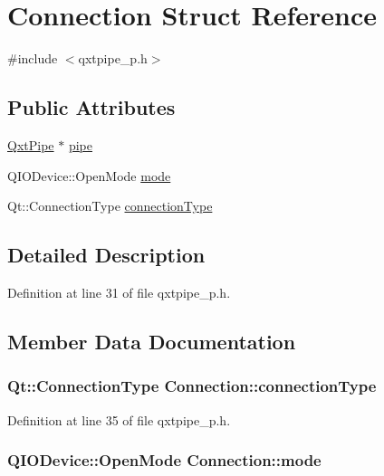 \hypertarget{struct_connection}{\section{Connection Struct Reference}
\label{struct_connection}
}


{\ttfamily \#include $<$qxtpipe\-\_\-p.\-h$>$}

\subsection*{Public Attributes}
\begin{DoxyCompactItemize}
\item 
\hyperlink{class_qxt_pipe}{Qxt\-Pipe} $\ast$ \hyperlink{struct_connection_ab227c6e0789a3c0a569f0a8912ef0364}{pipe}
\item 
Q\-I\-O\-Device\-::\-Open\-Mode \hyperlink{struct_connection_a35f72440ff0f76a89c1700b394a3990c}{mode}
\item 
Qt\-::\-Connection\-Type \hyperlink{struct_connection_ac46f218a8440e1e3ec23ba8bad70488f}{connection\-Type}
\end{DoxyCompactItemize}


\subsection{Detailed Description}


Definition at line 31 of file qxtpipe\-\_\-p.\-h.



\subsection{Member Data Documentation}
\hypertarget{struct_connection_ac46f218a8440e1e3ec23ba8bad70488f}{
\subsubsection[{connection\-Type}]{\setlength{\rightskip}{0pt plus 5cm}Qt\-::\-Connection\-Type Connection\-::connection\-Type}}\label{struct_connection_ac46f218a8440e1e3ec23ba8bad70488f}


Definition at line 35 of file qxtpipe\-\_\-p.\-h.

\hypertarget{struct_connection_a35f72440ff0f76a89c1700b394a3990c}{
\subsubsection[{mode}]{\setlength{\rightskip}{0pt plus 5cm}Q\-I\-O\-Device\-::\-Open\-Mode Connection\-::mode}}\label{struct_connection_a35f72440ff0f76a89c1700b394a3990c}


